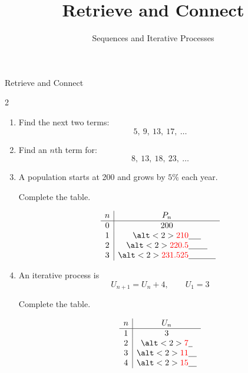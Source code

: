 \documentclass{beamer}
\title{Retrieve and Connect}
\subtitle{Sequences and Iterative Processes}
\newcommand{\ablank}[1]{%
  \alt<2>{\textcolor{red}{#1}}{\underline{\phantom{#1}}}%
}
\newcommand{\ashow}[1]{\uncover<2->{\textcolor{red}{\small #1}}}
\begin{document}
\begin{frame}{Retrieve and Connect}

\small

\begin{multicols}{2}

\begin{enumerate}

\item Find the next two terms:
\[
5,\ 9,\ 13,\ 17,\ \dots
\]

\ashow{$21,\ 25$}

\vspace{0.4cm}

\item Find an $n$th term for:
\[
8,\ 13,\ 18,\ 23,\ \dots
\]

\ashow{$5n+3$}

\vspace{0.4cm}

\item A population starts at 200 and grows by $5\%$ each year.

Complete the table.

\[
\begin{array}{c|c}
n & P_n \\
\hline
0 & 200 \\
1 & \ablank{210} \\
2 & \ablank{220.5} \\
3 & \ablank{231.525}
\end{array}
\]

\vspace{0.2cm}


\vspace{0.4cm}

\item An iterative process is
\[
U_{n+1} = U_n + 4, \qquad U_1 = 3
\]

Complete the table.

\[
\begin{array}{c|c}
n & U_n \\
\hline
1 & 3 \\
2 & \ablank{7} \\
3 & \ablank{11} \\
4 & \ablank{15}
\end{array}
\]

\end{enumerate}

\end{multicols}

\end{frame}
\end{document}
